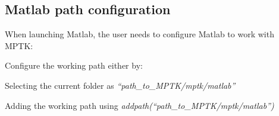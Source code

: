 \subsection{Matlab path configuration}

When launching Matlab, the user needs to configure Matlab to work with MPTK:
\begin{my_itemize}
	\item Configure the working path either by: 
	\begin{my_itemize}
		\item Selecting the current folder as \textcolor[rgb]{0.4,0.4,0.4}{\emph{``path\_to\_MPTK/mptk/matlab''}}
		\item Adding the working path using \textcolor[rgb]{0.4,0.4,0.4}{\emph{addpath(``path\_to\_MPTK/mptk/matlab'')}}
	\end{my_itemize}
\end{my_itemize}